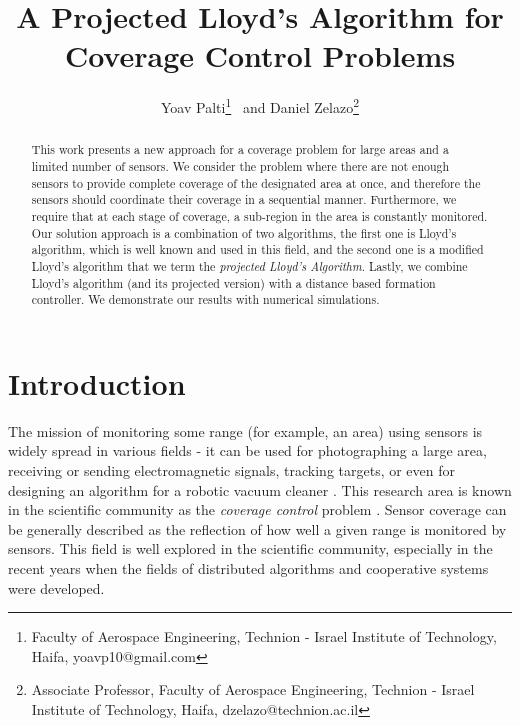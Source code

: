 \documentclass{iacas}
\begin{document}

\title{A Projected Lloyd's Algorithm for Coverage Control Problems}

\author{%
  Yoav Palti\thanks{Faculty of Aerospace Engineering, Technion - Israel Institute of Technology, Haifa, yoavp10@gmail.com}
  \ and
  Daniel Zelazo\thanks{Associate Professor, Faculty of Aerospace Engineering, Technion - Israel Institute of Technology, Haifa, dzelazo@technion.ac.il}
}

\maketitle

\begin{abstract}
This work presents a new approach for a coverage problem for large areas and a limited number of sensors. We consider the problem where there are not enough sensors to provide complete coverage of the designated area at once, and therefore the sensors should coordinate their coverage in a sequential manner.  Furthermore, we require that at each stage of coverage, a sub-region in the area is constantly monitored. Our solution approach is a combination of two algorithms, the first one is Lloyd's algorithm, which is well known and used in this field, and the second one is a modified Lloyd's algorithm that we term the \emph{projected Lloyd's Algorithm}. Lastly, we combine Lloyd's algorithm (and its projected version) with a distance based formation controller. We demonstrate our results with numerical simulations.
\end{abstract}

\section{Introduction}

The mission of monitoring some range (for example, an area) using sensors is widely spread in various fields - it can be used for photographing a large area, receiving or sending electromagnetic signals, tracking targets, or even for designing an algorithm for a robotic vacuum cleaner \cite{Nigam2012, 7798796, 7798244}.
%
This research area is known in the scientific community as the \emph{coverage control} problem \cite{Cassandras2005}. Sensor coverage can be generally described as the reflection of how well a given range is monitored by sensors. This field is well explored in the scientific community, especially in the recent years when the fields of distributed algorithms and cooperative systems were developed.
\end{document}
